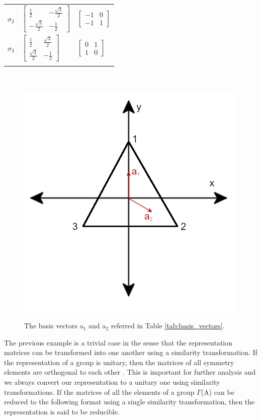 \documentclass[10pt,doublespacing,edeposit]{uiucthesis2020}
\begin{document}
\begin{mainmatter}
\begin{table}
\begin{tabular}{>{\centering\arraybackslash}p{3.5cm}>{\centering\arraybackslash}p{3.5cm}>{\centering\arraybackslash}p{3.5cm}}
\hline
\addlinespace[1.5ex]
\textbf{$\sigma_2$} & $\begin{bmatrix} \frac{1}{2} & -\frac{\sqrt{3}}{2} \\ -\frac{\sqrt{3}}{2} & -\frac{1}{2} \end{bmatrix}$ & $\begin{bmatrix} -1 & 0 \\ -1 & 1 \end{bmatrix}$ \\
\addlinespace[1.5ex]
\hline
\addlinespace[1.5ex]
\textbf{$\sigma_3$} & $\begin{bmatrix} \frac{1}{2} & \frac{\sqrt{3}}{2} \\ \frac{\sqrt{3}}{2} & -\frac{1}{2} \end{bmatrix}$ & $\begin{bmatrix} 0 & 1 \\ 1 & 0 \end{bmatrix}$ \\
\addlinespace[1.5ex]
\hline\hline
\end{tabular}
~\\
\end{table}

\begin{figure}
\centering\includegraphics[width=0.5\columnwidth]{figures/ch4/equilateral_triangle_basis_vectors.png} \\
\caption{\label{fig:C3v_a1_a2}
The basis vectors a$_1$ and a$_2$ referred in Table \ref{tab:basis_vectors}.
}
\end{figure}

The previous example is a trivial case in the sense that the representation matrices can be transformed into one another using a similarity transformation. If the representation of a group is unitary, then the matrices of all symmetry elements are orthogonal to each other \cite{Koster1956}. This is important for further analysis and we always convert our representation to a unitary one using similarity transformations. If the matrices of all the elements of a group $\Gamma$(A) can be reduced to the following format using a single similarity transformation, then the representation is said to be reducible.


\end{mainmatter}
\end{document}

